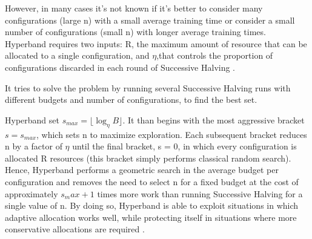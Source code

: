 However, in many cases it's not known if it's better to consider many configurations (large n) with a small average training time or consider a small number of configurations (small n) with longer average training times. \\ 

Hyperband requires two inputs: R, the maximum amount of resource that can
be allocated to a single configuration, and \(\eta\),that controls the proportion of
configurations discarded in each round of Successive Halving \cite{li2016novel}.

It tries to solve the problem by running several Successive Halving runs with different budgets and number of configurations, to find the best set.

Hyperband set  \( s_{max} = \lfloor \log_\eta B \rfloor \). It than begins with the most aggressive 
bracket \(s = s_{max}\), which sets n to maximize exploration. 
Each subsequent bracket reduces n by a factor of \(\eta\) until the final bracket, s = 0, in which every configuration is allocated R resources (this bracket simply performs classical random search). 
Hence, Hyperband performs a geometric search in the average budget per configuration and removes the need
to select n for a fixed budget at the cost of approximately \(s_max + 1\) times more work than
running Successive Halving for a single value of n. 
By doing so, Hyperband is able to exploit situations in which adaptive allocation works well, while protecting itself in situations where more conservative allocations are required \cite{li2016novel}.